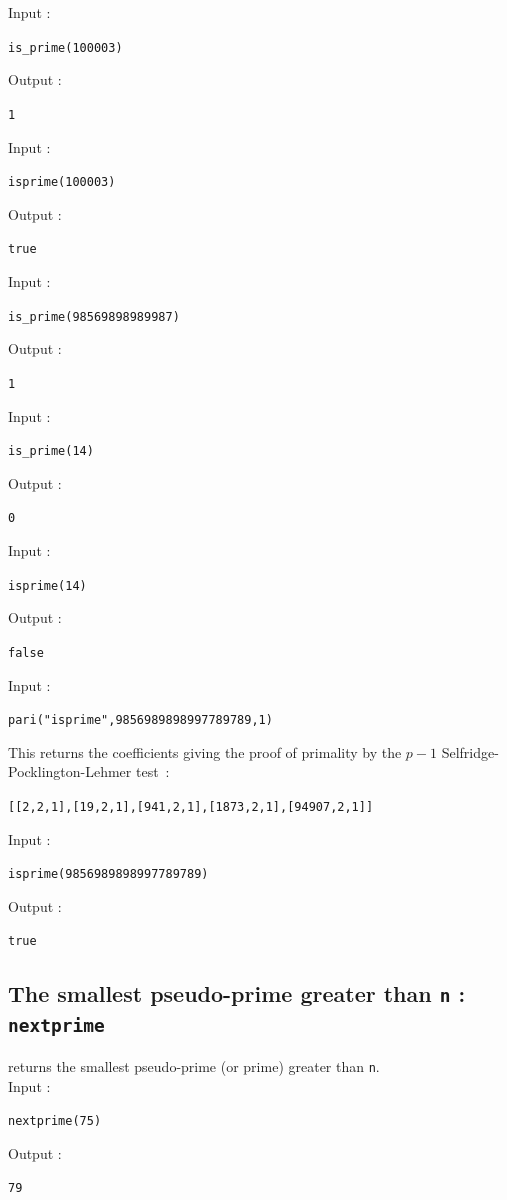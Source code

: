 \documentclass[a4paper,11pt]{book}
\begin{document}
Input :
\begin{center}{\tt is\_prime(100003)}\end{center}
Output :
\begin{center}{\tt 1}\end{center}
Input :
\begin{center}{\tt isprime(100003)}\end{center}
Output :
\begin{center}{\tt true}\end{center}
Input :                    
\begin{center}{\tt is\_prime(98569898989987)}\end{center}
Output :
\begin{center}{\tt 1}\end{center} 
Input :
\begin{center}{\tt is\_prime(14)}\end{center}
Output :
\begin{center}{\tt 0}\end{center}
Input :
\begin{center}{\tt isprime(14)}\end{center}
Output :
\begin{center}{\tt false}\end{center}
Input :
\begin{center}{\tt pari("isprime",9856989898997789789,1)}\end{center}
This returns the coefficients giving the proof of primality by the 
$p-1$ Selfridge-Pocklington-Lehmer test~:
\begin{center}
{\tt [[2,2,1],[19,2,1],[941,2,1],[1873,2,1],[94907,2,1]]}
\end{center}
Input :
\begin{center}{\tt isprime(9856989898997789789)}\end{center}
Output :
\begin{center}{\tt true}\end{center}

\subsection{The smallest pseudo-prime greater than {\tt n} : {\tt nextprime}}
 returns the smallest pseudo-prime (or prime)
greater than {\tt n}. \\
Input :
\begin{center}{\tt  nextprime(75) }\end{center}
Output :
\begin{center}{\tt 79}\end{center}
\end{document}
